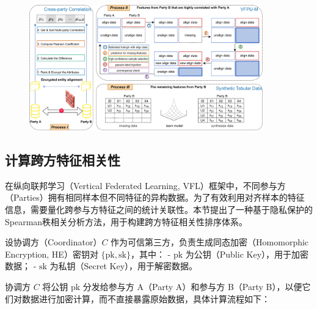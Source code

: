 \vspace{-0.1cm}
\begin{figure}[H]  %
	\centering     %
	\includegraphics[width=0.9\textwidth]{chapters/imgs/FedPSG-PUM }  
	
	
	\label{fig: FedPSG-PUM }  %
\end{figure}
\vspace{-0.35cm}

\subsection{计算跨方特征相关性}
在纵向联邦学习（Vertical Federated Learning, VFL）框架中，不同参与方（Parties）拥有相同样本但不同特征的异构数据。为了有效利用对齐样本的特征信息，需要量化跨参与方特征之间的统计关联性。本节提出了一种基于隐私保护的Spearman秩相关分析方法，用于构建跨方特征相关性排序体系。

设协调方（Coordinator）$ C $ 作为可信第三方，负责生成同态加密（Homomorphic Encryption, HE）密钥对 $ \{\text{pk}, \text{sk}\} $，其中：
- $ \text{pk} $ 为公钥（Public Key），用于加密数据；
- $ \text{sk} $ 为私钥（Secret Key），用于解密数据。

协调方 $ C $ 将公钥 $ \text{pk} $ 分发给参与方 A（Party A）和参与方 B（Party B），以便它们对数据进行加密计算，而不直接暴露原始数据，具体计算流程如下：

